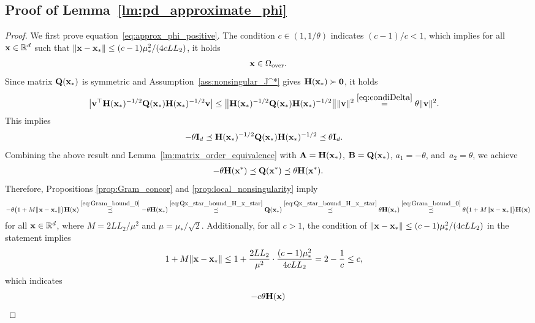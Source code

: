\documentclass[11pt]{article}
\theoremstyle{plain}
\theoremstyle{definition}
\theoremstyle{remark}
\theoremstyle{plain}
\def\vx{{\bf{x}}}
\def\BR{{\mathbb{R}}}
\def\vx {{{\bf x}}}
\def\BR{{\mathbb{R}}}
\def\A{{\bf A}}
\def\B{{\bf B}}
\def\H{{\bf H}}
\def\I{{\bf I}}
\def\Q{{\bf Q}}
\def\v{{\bf v}}
\def\x{{\bf x}}
\def\0{{\bf 0}}
\begin{document}
\subsection{Proof of Lemma~\ref{lm:pd_approximate_phi}}
\label{app:proof_lemma_pd_approximate_phi}
\begin{proof}
We first prove equation~\eqref{eq:approx_phi_positive}.
The condition $c\in(1,1/\theta)$ indicates $(c-1)/c<1$, 
which implies for all $\vx\in\BR^d$ such that $\|\x-\x_*\|\leq(c-1)\mu_*^2/(4cLL_2)$, it holds
\begin{align*}
\x\in\Omega_{\mathrm{over}}.     
\end{align*}
Since matrix $\Q(\x_*)$ is symmetric and Assumption~\ref{ass:nonsingular_J^*} gives $\H(\x_*)\succ\0$, 
it holds 
\begin{align*}
\big|\v^{\top}\H(\x_*)^{-1/2}\Q(\x_*)
\H(\x_*)^{-1/2}\v\big|
&\leq\big\|\H(\x_*)^{-1/2}\Q(\x_*)\H(\x_*)^{-1/2}\big\|
\|\v\|^2\overset{\eqref{eq:condiDelta}}=\theta\|\v\|^2.
\end{align*}
This implies
\begin{align*}
-\theta\I_d
&\preceq\H(\x_*)^{-1/2}\Q(\x_*)\H(\x_*)^{-1/2}
\preceq\theta\I_d.
\end{align*}
Combining the above result and Lemma~\ref{lm:matrix_order_equivalence} with
$\A=\H(\x_*)$, $\B=\Q(\x_*)$, $a_1=-\theta$, and~$a_2=\theta$, we achieve
\begin{align}
    \label{eq:Qx_star_bound_H_x_star}
-\theta \H(\x^*)\preceq \Q(\x^*)\preceq \theta \H(\x^*).
\end{align}
Therefore, Propositions \ref{prop:Gram_concor} and \ref{prop:local_nonsingularity} imply
\begin{align*}
-\theta\bigl(1+M\|\x-\x_*\|\bigr)\H(\x)
\overset{\eqref{eq:Gram_bound_0}}{\preceq}-\theta\H(\x_*)
\overset{\eqref{eq:Qx_star_bound_H_x_star}}{\preceq}\Q(\x_*)
\overset{\eqref{eq:Qx_star_bound_H_x_star}}{\preceq}\theta\H(\x_*)\overset{\eqref{eq:Gram_bound_0}}{\preceq}\theta\bigl(1+M\|\x-\x_*\|\bigr)\H(\x)
\end{align*}
for all $\vx\in\BR^d$, where $M=2LL_2/\mu^2$ and $\mu=\mu_*/\sqrt{2}$.
Additionally, for all $c>1$, the condition of $\|\x-\x_*\|\leq(c-1)\mu_*^2/(4cLL_2)$  in the statement implies
\begin{align*}
1+M\|\x-\x_*\|
&\leq1+\frac{2LL_2}{\mu^2}\cdot
\frac{(c-1)\mu_*^2}{4cLL_2}
=2-\frac{1}{c}\leq c,
\end{align*}
which indicates
\begin{align}
    \label{eq:Qx_star_bound}
-c\theta\H(\x)

\end{align}
\end{proof}
\end{document}
